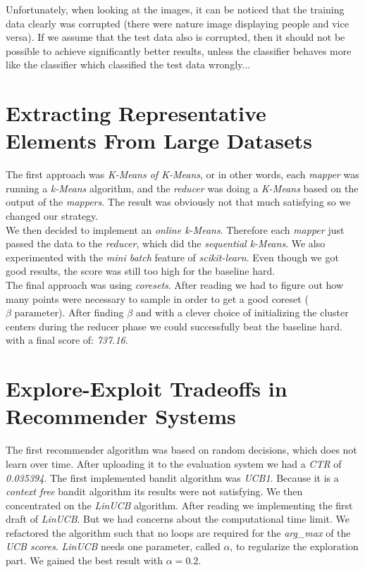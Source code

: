 \documentclass[a4paper, 11pt]{article}
\begin{document}
Unfortunately, when looking at the images, it can be noticed that the training data clearly was corrupted (there were nature image displaying people and vice versa). If we assume that the test data also is corrupted, then it should not be possible to achieve significantly better results, unless the classifier behaves more like the classifier which classified the test data wrongly...


\section{Extracting Representative Elements From Large Datasets}
The first approach was \emph{K-Means of K-Means}, or in other words, each \emph{mapper} was running a \emph{k-Means} algorithm, and the \emph{reducer} was doing a \emph{K-Means} based on the output of the \emph{mappers}. The result was obviously not that much satisfying so we changed our strategy. \\

We then decided to implement an \emph{online k-Means}. Therefore each \emph{mapper} just passed the data to the \emph{reducer}, which did the \emph{sequential k-Means}. We also experimented with the \emph{mini batch} feature of \emph{scikit-learn}. Even though we got good results, the score was still too high for the baseline hard.\\

The final approach was using \emph{coresets}. After reading \cite{coreset} we had to figure out how many points were necessary to sample in order to get a good coreset ($\beta \text{ parameter}$). After finding $\beta$ and with a clever choice of initializing the cluster centers during the reducer phase we could successfully beat the baseline hard. with a final score of: \emph{737.16}.


\section{Explore-Exploit Tradeoffs in Recommender Systems}
The first recommender algorithm was based on random decisions, which does not learn over time. After uploading it to the evaluation system we had a \emph{CTR} of \emph{0.035394}. The first implemented bandit algorithm was \emph{UCB1}. Because it is a \emph{context free} bandit algorithm its results were not satisfying. 
We then concentrated on the \emph{LinUCB} algorithm. After reading \cite{LinUCB} we implementing the first draft of \emph{LinUCB}. But we had concerns about the computational time limit. We refactored the algorithm such that no loops are required for the \emph{arg\_max} of the \emph{UCB scores}. \emph{LinUCB} needs one parameter, called $\alpha$, to regularize the exploration part. We gained the best result with $\alpha=0.2$.\\
\end{document}
